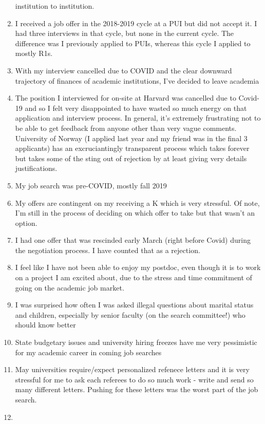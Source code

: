\documentclass[]{article}
\begin{document}
\begin{enumerate}
  institution to institution.
\item
  I received a job offer in the 2018-2019 cycle at a PUI but did not
  accept it. I had three interviews in that cycle, but none in the
  current cycle. The difference was I previously applied to PUIs,
  whereas this cycle I applied to mostly R1s.
\item
  With my interview cancelled due to COVID and the clear downward
  trajectory of finances of academic institutions, I've decided to leave
  academia
\item
  The position I interviewed for on-site at Harvard was cancelled due to
  Covid-19 and so I felt very disappointed to have wasted so much energy
  on that application and interview process. In general, it's extremely
  frustrating not to be able to get feedback from anyone other than very
  vague comments. University of Norway (I applied last year and my
  friend was in the final 3 applicants) has an excruciantingly
  transparent process which takes forever but takes some of the sting
  out of rejection by at least giving very details justifications.
\item
  My job search was pre-COVID, mostly fall 2019
\item
  My offers are contingent on my receiving a K which is very stressful.
  Of note, I'm still in the process of deciding on which offer to take
  but that wasn't an option.
\item
  I had one offer that was rescinded early March (right before Covid)
  during the negotiation process. I have counted that as a rejection.
\item
  I feel like I have not been able to enjoy my postdoc, even though it
  is to work on a project I am excited about, due to the stress and time
  commitment of going on the academic job market.
\item
  I was surprised how often I was asked illegal questions about marital
  status and children, especially by senior faculty (on the search
  committee!) who should know better
\item
  State budgetary issues and university hiring freezes have me very
  pessimistic for my academic career in coming job searches
\item
  May universities require/expect personalized refenece letters and it
  is very stressful for me to ask each referees to do so much work -
  write and send so many different letters. Pushing for these letters
  was the worst part of the job search.
\item

\end{enumerate}
\end{document}
